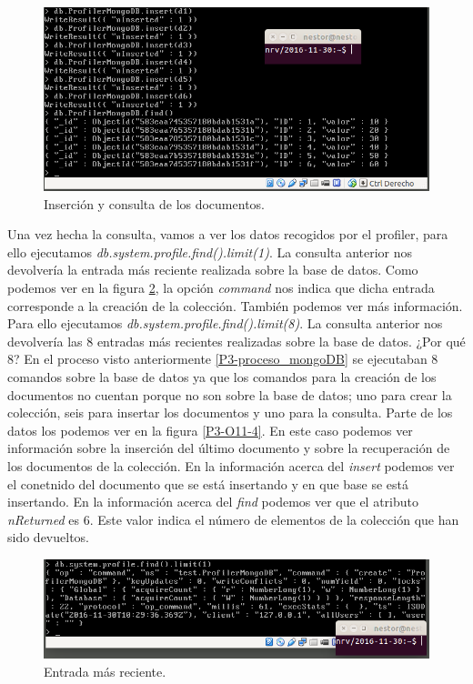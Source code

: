 \documentclass[a4paper,titlepage,12pt]{report}	%
\numberwithin{figure}{section} %
\numberwithin{table}{section} %
\begin{document}
	\begin{figure}[H]
	   \includegraphics[width=\linewidth]{./Imagenes/P3/O11-2.png}
	   \vspace{-0.5cm}
	   \caption[Inserción y consulta de los documentos.]{Inserción y consulta de los documentos.}
	   \label{P3-O11-2}
	\end{figure}

	Una vez hecha la consulta, vamos a ver los datos recogidos por el profiler, para ello ejecutamos \textit{db.system.profile.find().limit(1)}. La consulta anterior nos devolvería la entrada más reciente realizada sobre la base de datos. Como podemos ver en la figura \ref{P3-O11-3}, la opción \textit{command} nos indica que dicha entrada corresponde a la creación de la colección. También podemos ver más información. Para ello ejecutamos \textit{db.system.profile.find().limit(8)}. La consulta anterior nos devolvería las 8 entradas más recientes realizadas sobre la base de datos. ¿Por qué 8? En el proceso visto anteriormente \ref{P3-proceso_mongoDB} se ejecutaban 8 comandos sobre la base de datos ya que los comandos para la creación de los documentos no cuentan porque no son sobre la base de datos; uno para crear la colección, seis para insertar los documentos y uno para la consulta. Parte de los datos los podemos ver en la figura \ref{P3-O11-4}. En este caso podemos ver información sobre la inserción del último documento y sobre la recuperación de los documentos de la colección. En la información acerca del \textit{insert} podemos ver el conetnido del documento que se está insertando y en que base se está insertando. En la información acerca del \textit{find} podemos ver que el atributo \textit{nReturned} es 6. Este valor indica el número de elementos de la colección que han sido devueltos.

	\begin{figure}[H]
	   \includegraphics[width=\linewidth]{./Imagenes/P3/O11-3.png}
	   \vspace{-0.5cm}
	   \caption[Entrada más reciente.]{Entrada más reciente.}
	   \label{P3-O11-3}
	\end{figure}
\end{document}
